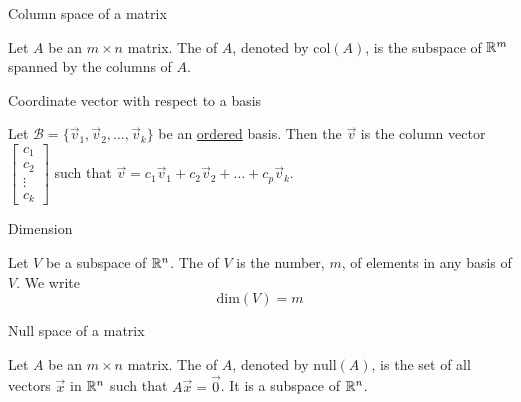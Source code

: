 \documentclass{ximera}
\begin{document}
Column space of a matrix
\begin{expandable}
    Let $A$ be an $m\times n$ matrix.  The  of $A$, denoted by $\mbox{col}(A)$, is the subspace of $\mathbb{R}^m$ spanned by the columns of $A$.
\end{expandable}


Coordinate vector with respect to a basis
\begin{expandable}
    Let $\mathcal{B} = \{\vec{v}_1, \vec{v}_2,\ldots ,\vec{v}_k\}$ be an \underline{ordered} basis.  Then the  $\vec{v}$ is the  column vector $\begin{bmatrix}c_1\\ c_2\\ \vdots \\c_k\end{bmatrix}$ such that $\vec{v} = c_1\vec{v}_1+c_2\vec{v}_2+\ldots +c_p\vec{v}_k$.
\end{expandable}


Dimension
\begin{expandable}
    Let $V$ be a subspace of $\mathbb{R}^n$.  The  of $V$ is the number, $m$, of elements in any basis of $V$.  We write
$$\mbox{dim}(V)=m$$
\end{expandable}


Null space of a matrix
\begin{expandable}
    Let $A$ be an $m\times n$ matrix.  The  of $A$, denoted by $\mbox{null}(A)$, is the set of all vectors $\vec{x}$ in $\mathbb{R}^n$ such that $A\vec{x}=\vec{0}$.   
    It is a subspace of $\mathbb{R}^n$.
\end{expandable}

\end{document}
